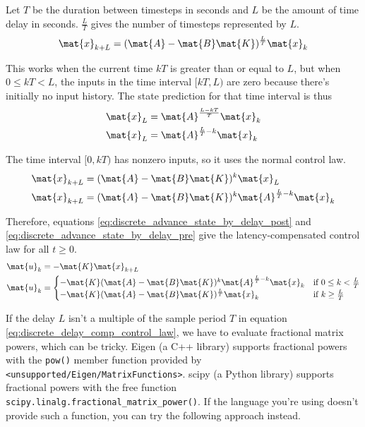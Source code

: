 Let $T$ be the duration between timesteps in seconds and $L$ be the amount of
time delay in seconds. $\frac{L}{T}$ gives the number of timesteps represented
by $L$.
\begin{equation}
  \mat{x}_{k+L} = (\mat{A} - \mat{B}\mat{K})^\frac{L}{T} \mat{x}_k
    \label{eq:discrete_advance_state_by_delay_post}
\end{equation}

This works when the current time $kT$ is greater than or equal to $L$, but when
$0 \leq kT < L$, the inputs in the time interval $[kT, L)$ are zero because
there's initially no input history. The state prediction for that time interval
is thus
\begin{align*}
  \mat{x}_L &= \mat{A}^\frac{L - kT}{T} \mat{x}_k \\
  \mat{x}_L &= \mat{A}^{\frac{L}{T} - k} \mat{x}_k
\end{align*}

The time interval $[0, kT)$ has nonzero inputs, so it uses the normal control
law.
\begin{align}
  \mat{x}_{k + L} &= (\mat{A} - \mat{B}\mat{K})^k \mat{x}_L \nonumber \\
  \mat{x}_{k + L} &= (\mat{A} - \mat{B}\mat{K})^k
    \mat{A}^{\frac{L}{T} - k} \mat{x}_k
    \label{eq:discrete_advance_state_by_delay_pre}
\end{align}

Therefore, equations \eqref{eq:discrete_advance_state_by_delay_post} and
\eqref{eq:discrete_advance_state_by_delay_pre} give the latency-compensated
control law for all $t \geq 0$.
\begin{align}
  \mat{u}_k &= -\mat{K} \mat{x}_{k + L} \nonumber \\
  \mat{u}_k &=
  \begin{cases}
    -\mat{K} (\mat{A} - \mat{B}\mat{K})^k \mat{A}^{\frac{L}{T} - k} \mat{x}_k &
      \text{if } 0 \leq k < \frac{L}{T} \\
    -\mat{K} (\mat{A} - \mat{B}\mat{K})^\frac{L}{T} \mat{x}_k &
      \text{if } k \geq \frac{L}{T}
  \end{cases}
  \label{eq:discrete_delay_comp_control_law}
\end{align}

If the delay $L$ isn't a multiple of the sample period $T$ in equation
\eqref{eq:discrete_delay_comp_control_law}, we have to evaluate fractional
matrix powers, which can be tricky. Eigen (a C++ library) supports fractional
powers with the \texttt{pow()} member function provided by
\texttt{<unsupported/Eigen/MatrixFunctions>}. scipy (a Python library) supports
fractional powers with the free function
\texttt{scipy.linalg.fractional\_matrix\_power()}. If the language you're using
doesn't provide such a function, you can try the following approach instead.

